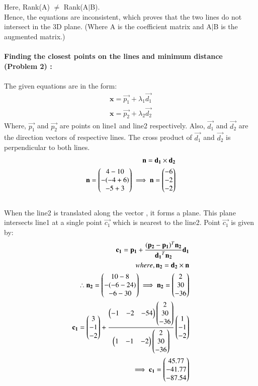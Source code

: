 \documentclass[journal,12pt,twocolumn]{IEEEtran}
\begin{document}
Here, Rank(A) $\neq$ Rank(A$\mid$B).
\\
Hence, the equations are inconsistent, which proves that the two lines do not intersect in the 3D plane. (Where A is the coefficient matrix and A$\mid$B is the augmented matrix.) \\
\\
\noindent
\textbf{Finding the closest points on the lines and minimum distance (Problem 2) :}\\
\\
The given equations are in the form:
\begin{align}
    \textbf{x}=\vec{p_1} + \lambda_1\vec{d_1}\\
    \textbf{x}=\vec{p_2} + \lambda_2\vec{d_2}
\end{align}
Where, $\vec{p_1}$ and $\vec{p_2}$ are points on line1 and line2 respectively. Also, $\vec{d_1}$ and $\vec{d_2}$ are the direction vectors of respective lines.
The cross product of $\vec{d_1}$ and $\vec{d_2}$ is perpendicular to both lines.
\begin{align}
    \mathbf{n} = \mathbf{d_1} \times \mathbf{d_2}\\
    \mathbf{n}=\begin{pmatrix}4-10 \\ -(-4+6) \\ -5+3\end{pmatrix}
     \implies \mathbf{n}=\begin{pmatrix}-6 \\ -2 \\ -2 \end{pmatrix}
\end{align}
\\
When the line2 is translated along the vector , it forms a plane. This plane intersects line1 at a single point $\vec{c_1}$ which is nearest to the line2. Point $\vec{c_1}$ is given by:
\\
\begin{align}
\mathbf{c_1}=\mathbf{p_1}+\frac{(\mathbf{p_2}-\mathbf{p_1})^T \mathbf{n_2}}{\mathbf{d_1}^T \mathbf{n_2}}\mathbf{d_1} \\
where, \mathbf{n_2}=\mathbf{d_2}\times \mathbf{n}\\
 \therefore \mathbf{n_2}=\begin{pmatrix}10-8 \\ -(-6-24) \\ -6-30\end{pmatrix}
\implies \mathbf{n_2}=\begin{pmatrix}2 \\ 30 \\ -36\end{pmatrix}\\
\mathbf{c_1}= \begin{pmatrix}3\\-1\\-2\end{pmatrix}+\frac{\begin{pmatrix}-1&-2&-54\end{pmatrix} \begin{pmatrix}2\\30\\-36\end{pmatrix}}{\begin{pmatrix}1&-1&-2\end{pmatrix} \begin{pmatrix}2\\30\\-36\end{pmatrix}}\begin{pmatrix}1\\-1\\-2\end{pmatrix}\\
\implies \mathbf{c_1}=\begin{pmatrix}45.77 \\ -41.77\\ -87.54\end{pmatrix}
\end{align}
\end{document}
